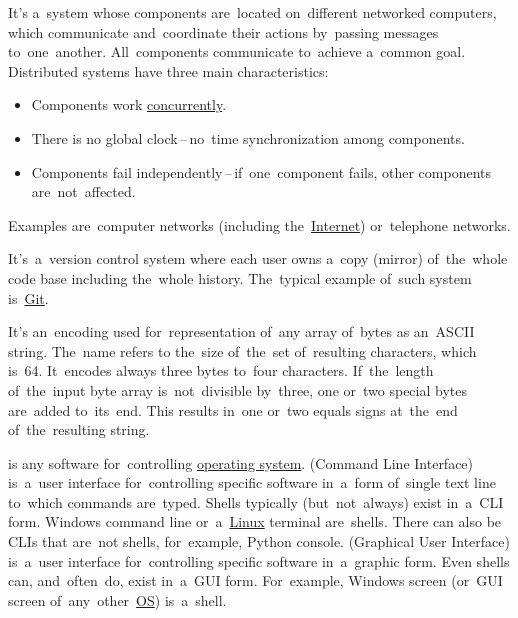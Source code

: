 \label{distributedsystem}
It's a~system whose components are~located on~different networked computers, which communicate and~coordinate their actions by~passing messages to~one~another.
All~components communicate to~achieve a~common goal.
Distributed systems have three main characteristics:
\begin{itemize}
    \item Components work \hyperref[concurrency]{concurrently}.
    \item There is no global clock\,--\,no~time synchronization among components.
    \item Components fail independently\,--\,if~one~component fails, other components are~not~affected.
\end{itemize}
\noindent Examples are~computer networks (including the~\hyperref[internetweb]{Internet}) or~telephone networks.

\label{distributedversioncontrolsystem}
It's~a~version control system where each user owns a~copy (mirror) of~the~whole code base including the~whole history.
The~typical example of~such system is~\hyperref[git]{Git}.

\label{multitasking}

\label{concurrency}

\label{loosetightcoupling}

\label{base64}
It's an~encoding used for~representation of~any array of~bytes as an~ASCII string.
The~name refers to the~size of~the~set of~resulting characters, which is~64.
It~encodes always three bytes to~four characters.
If~the~length of~the~input byte array is~not~divisible by~three, one or~two special bytes are~added to~its~end.
This results in~one or~two equals signs at~the~end of~the~resulting string.

\label{shellcligui}
\begin{itemize}
     is any software for~controlling \hyperref[os]{operating system}.
     (Command Line Interface) is~a~user interface for~controlling specific software in~a~form of~single text line to~which commands are~typed.
            Shells typically (but~not~always) exist in~a~CLI form.
            Windows command line or~a~\hyperref[linux]{Linux} terminal are~shells.
            There can also be CLIs that are~not shells, for~example, Python console.
     (Graphical User Interface) is~a~user interface for~controlling specific software in~a~graphic form.
            Even shells can, and~often~do, exist in~a~GUI form.
            For~example, Windows screen (or~GUI screen of~any~other~\hyperref[os]{OS}) is~a~shell.
\end{itemize}

